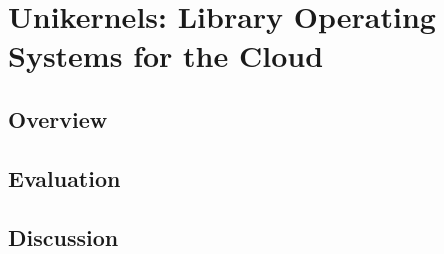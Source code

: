 \section{Unikernels: Library Operating Systems for the Cloud}

\subsection{Overview}

\subsection{Evaluation}

\subsection{Discussion}